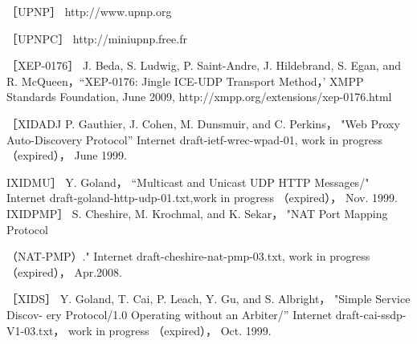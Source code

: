 ［UPNP］ http://www.upnp.org

［UPNPC］ http://miniupnp.free.fr

［XEP-0176］ J. Beda, S. Ludwig, P. Saint-Andre, J. Hildebrand, S. Egan, and R.
McQueen，“XEP-0176: Jingle ICE-UDP Transport Method，' XMPP Standards
Foundation, June 2009, http://xmpp.org/extensions/xep-0176.html

［XIDADJ P. Gauthier, J. Cohen, M. Dunsmuir, and C. Perkins， "Web Proxy
Auto-Discovery Protocol” Internet draft-ietf-wrec-wpad-01, work in progress
（expired）， June 1999.

IXIDMU］ Y. Goland， “Multicast and Unicast UDP HTTP Messages/" Internet
draft-goland-http-udp-01.txt,work in progress （expired）， Nov. 1999.
IXIDPMP］ S. Cheshire, M. Krochmal, and K. Sekar， "NAT Port Mapping Protocol

（NAT-PMP）." Internet draft-cheshire-nat-pmp-03.txt, work in progress （expired），
Apr.2008.

［XIDS］ Y. Goland, T. Cai, P. Leach, Y. Gu, and S. Albright， "Simple Service Discov-
ery Protocol/1.0 Operating without an Arbiter/” Internet draft-cai-ssdp-V1-03.txt，
work in progress （expired）， Oct. 1999.